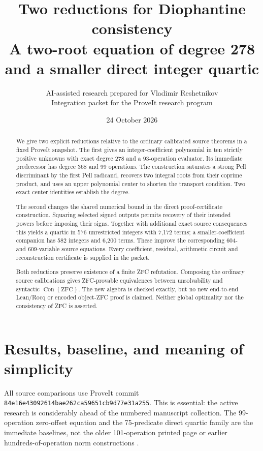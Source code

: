 \documentclass[11pt]{article}
\title{\vspace{-1.5em}\textbf{Two reductions for Diophantine consistency}\\[.4em]
\large A two-root equation of degree 278 and a smaller direct integer quartic}
\author{AI-assisted research prepared for Vladimir Reshetnikov\\
\small Integration packet for the ProveIt research program}
\date{24 October 2026}
\theoremstyle{remark}\newtheorem{remark}[theorem]{Remark}
\newcommand{\Con}{\operatorname{Con}}
\newcommand{\pin}{\texttt{84e16e43092614bae262ca59651cb9d77e31a255}}
\begin{document}
\maketitle\thispagestyle{empty}
\begin{abstract}
We give two explicit reductions relative to the ordinary calibrated source
theorems in a fixed ProveIt snapshot. The first gives an integer-coefficient
polynomial in ten strictly positive unknowns with exact degree 278 and a
93-operation evaluator. Its immediate predecessor has degree 368 and 99
operations. The construction saturates a strong Pell discriminant by the first
Pell radicand, recovers two integral roots from their coprime product, and uses
an upper polynomial center to shorten the transport condition. Two exact
center identities establish the degree.

The second changes the shared numerical bound in the direct proof-certificate
construction. Squaring selected signed outputs permits recovery of their
intended powers before imposing their signs. Together with additional exact
source consequences this yields a quartic in 576 unrestricted integers with
7,172 terms; a smaller-coefficient companion has 582 integers and 6,200 terms.
These improve the corresponding 604- and 609-variable source equations.
Every coefficient, residual, arithmetic circuit and reconstruction certificate
is supplied in the packet.

Both reductions preserve existence of a finite ZFC refutation. Composing the
ordinary source calibrations gives ZFC-provable equivalences between
unsolvability and syntactic $\Con(\mathrm{ZFC})$. The new algebra is checked
exactly, but no new end-to-end Lean/Rocq or encoded object-ZFC proof is claimed.
Neither global optimality nor the consistency of ZFC is asserted.
\end{abstract}

\newpage
\tableofcontents
\newpage

\section{Results, baseline, and meaning of simplicity}

All source comparisons use ProveIt commit \pin. This is essential: the active
research is considerably ahead of the numbered manuscript collection. The
99-operation zero-offset equation and the 75-predicate direct quartic family
are the immediate baselines, not the older 101-operation printed page or
earlier hundreds-of-operation norm constructions \cite{zerooffset,output75}.
\end{document}
